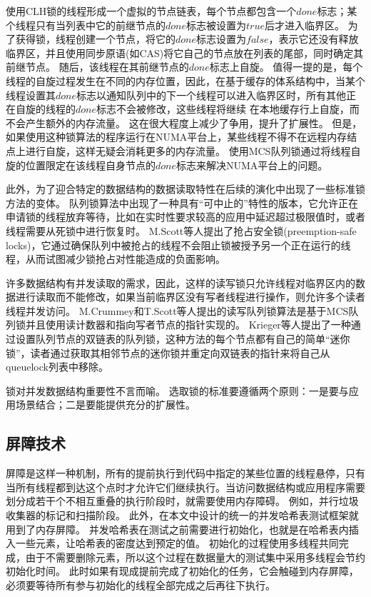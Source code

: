 使用CLH锁的线程形成一个虚拟的节点链表，每个节点都包含一个$done$标志；某个线程只有当列表中它的前继节点的$done$标志被设置为$true$后才进入临界区。
为了获得锁，线程创建一个节点，将它的$done$标志设置为$false$，表示它还没有释放临界区，并且使用同步原语(如CAS)将它自己的节点放在列表的尾部，同时确定其前继节点。
随后，该线程在其前继节点的$done$标志上自旋。
值得一提的是，每个线程的自旋过程发生在不同的内存位置，因此，在基于缓存的体系结构中，当某个线程设置其$done$标志以通知队列中的下一个线程可以进入临界区时，所有其他正在自旋的线程的$done$标志不会被修改，这些线程将继续 在本地缓存行上自旋，而不会产生额外的内存流量。
这在很大程度上减少了争用，提升了扩展性。
但是，如果使用这种锁算法的程序运行在NUMA平台上，某些线程不得不在远程内存结点上进行自旋，这样无疑会消耗更多的内存流量。
使用MCS队列锁\cite{mellor1991algorithms}通过将线程自旋的位置限定在该线程自身节点的$done$标志来解决NUMA平台上的问题。

此外，为了迎合特定的数据结构的数据读取特性在后续的演化中出现了一些标准锁方法的变体。
队列锁算法中出现了一种具有“可中止的”特性的版本，它允许正在申请锁的线程放弃等待，比如在实时性要求较高的应用中延迟超过极限值时\cite{scott2002non,scott2001scalable}，或者线程需要从死锁中进行恢复时。
M.Scott等人提出了抢占安全锁(preemption-safe locks)\cite{michael1998nonblocking}，它通过确保队列中被抢占的线程不会阻止锁被授予另一个正在运行的线程，从而试图减少锁抢占对性能造成的负面影响。

许多数据结构有并发读取的需求，因此，这样的读写锁只允许线程对临界区内的数据进行读取而不能修改，如果当前临界区没有写者线程进行操作，则允许多个读者线程并发访问。
M.Crummey和T.Scott等人提出的读写队列锁算法是基于MCS队列锁并且使用读计数器和指向写者节点的指针实现的\cite{mellor1991scalable}。
Krieger等人\cite{krieger1993fair}提出了一种通过设置队列节点的双链表的队列锁，这种方法的每个节点都有自己的简单“迷你锁”，读者通过获取其相邻节点的迷你锁并重定向双链表的指针来将自己从queuelock列表中移除。

锁对并发数据结构重要性不言而喻。
选取锁的标准要遵循两个原则：一是要与应用场景结合；二是要能提供充分的扩展性。

\subsection{屏障技术}

屏障是这样一种机制，所有的提前执行到代码中指定的某些位置的线程悬停，只有当所有线程都到达这个点时才允许它们继续执行。当访问数据结构或应用程序需要划分成若干个不相互重叠的执行阶段时，就需要使用内存障碍。
例如，并行垃圾收集器的标记和扫描阶段。
此外，在本文中设计的统一的并发哈希表测试框架就用到了内存屏障。
并发哈希表在测试之前需要进行初始化，也就是在哈希表内插入一些元素，让哈希表的密度达到预定的值。
初始化的过程使用多线程共同完成，由于不需要删除元素，所以这个过程在数据量大的测试集中采用多线程会节约初始化时间。
此时如果有现成提前完成了初始化的任务，它会触碰到内存屏障，必须要等待所有参与初始化的线程全部完成之后再往下执行。

